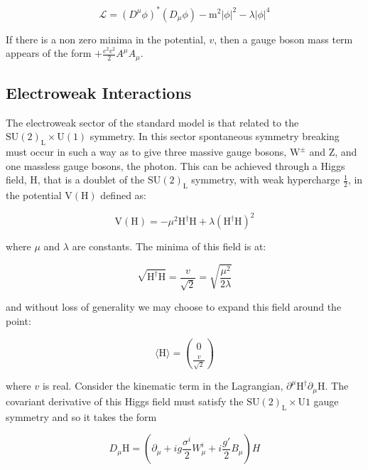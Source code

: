 \begin{equation}
\mathcal{L} = (D^{\mu} \phi)^{*} (D_{\mu} \phi) - \text{m}^{2} |\phi|^{2} - \lambda |\phi|^{4}
\end{equation}

If there is a non zero minima in the potential, $v$, then a gauge boson mass term appears of the form $+\frac{e^{2}v^{2}}{2} A^{\mu} A_{\mu}$.


\subsection{Electroweak Interactions}
The electroweak sector of the standard model is that related to the $\text{SU}(2)_{\text{L}} \times \text{U}(1)$ symmetry.  In this sector spontaneous symmetry breaking must occur in such a way as to give three massive gauge bosons,  $\text{W}^{\pm}$ and Z, and one massless gauge bosons, the photon.  This can be achieved through a Higgs field, H, that is a doublet of the $\text{SU}(2)_{\text{L}}$ symmetry, with weak hypercharge $\frac{1}{2}$, in the potential $\text{V}(\text{H})$ defined as:

\begin{equation}
\text{V}(\text{H}) = -\mu^{2}\text{H}^{\dagger}\text{H} + \lambda (\text{H}^{\dagger}\text{H})^{2}
\end{equation}

where $\mu$ and $\lambda$ are constants.  The minima of this field is at:

\begin{equation}
\sqrt{\text{H}^{\dagger}\text{H}} = \frac{v}{\sqrt{2}} = \sqrt{\frac{\mu^{2}}{2\lambda}}
\end{equation}

and without loss of generality we may choose to expand this field around the point:

\begin{equation}
\langle \text{H} \rangle = \binom{0}{\frac{v}{\sqrt{2}}}
\end{equation}

where $v$ is real.  Consider the kinematic term in the Lagrangian, $\partial^{\mu} \text{H}^{\dagger} \partial_{\mu} \text{H}$.  The covariant derivative of this Higgs field must satisfy the $\text{SU}(2)_{\text{L}} \times \text{U}1$ gauge symmetry and so it takes the form

\begin{equation}
D_{\mu} \text{H} = (\partial_{\mu} + ig\frac{\sigma^{i}}{2}W^{i}_{\mu} + i\frac{g'}{2}B_{\mu})H
\end{equation}

